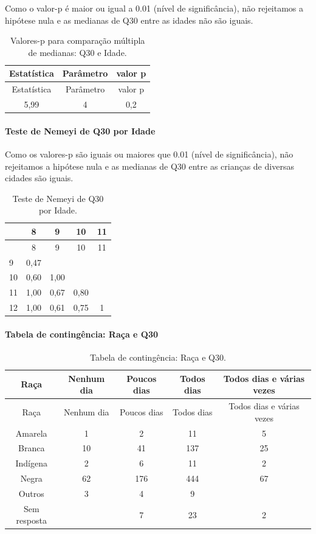 \documentclass[]{article}
\let\oldparagraph\paragraph
\renewcommand{\paragraph}[1]{\oldparagraph{#1}\mbox{}}
\begin{document}
Como o valor-p é maior ou igual a 0.01 (nível de significância), não rejeitamos a hipótese nula e as medianas de Q30 entre as idades não são iguais.

\begin{longtable}[]{@{}ccc@{}}
\caption{\label{tab:unnamed-chunk-983}Valores-p para comparação múltipla de medianas: Q30 e Idade.}\tabularnewline
\toprule
Estatística & Parâmetro & valor p\tabularnewline
\midrule
\endfirsthead
\toprule
Estatística & Parâmetro & valor p\tabularnewline
\midrule
\endhead
5,99 & 4 & 0,2\tabularnewline
\bottomrule
\end{longtable}

\hypertarget{teste-de-nemeyi-de-q30-por-idade}{%
\paragraph{Teste de Nemeyi de Q30 por Idade}\label{teste-de-nemeyi-de-q30-por-idade}}

Como os valores-p são iguais ou maiores que 0.01 (nível de significância), não rejeitamos a hipótese nula e as medianas de Q30 entre as crianças de diversas cidades são iguais.

\begin{longtable}[]{@{}lcccc@{}}
\caption{\label{tab:unnamed-chunk-985}Teste de Nemeyi de Q30 por Idade.}\tabularnewline
\toprule
& 8 & 9 & 10 & 11\tabularnewline
\midrule
\endfirsthead
\toprule
& 8 & 9 & 10 & 11\tabularnewline
\midrule
\endhead
9 & 0,47 & & &\tabularnewline
10 & 0,60 & 1,00 & &\tabularnewline
11 & 1,00 & 0,67 & 0,80 &\tabularnewline
12 & 1,00 & 0,61 & 0,75 & 1\tabularnewline
\bottomrule
\end{longtable}

\cleardoublepage

\hypertarget{tabela-de-continguxeancia-rauxe7a-e-q30}{%
\paragraph{Tabela de contingência: Raça e Q30}\label{tabela-de-continguxeancia-rauxe7a-e-q30}}

\begin{longtable}[]{@{}ccccc@{}}
\caption{\label{tab:unnamed-chunk-986}Tabela de contingência: Raça e Q30.}\tabularnewline
\toprule
Raça & Nenhum dia & Poucos dias & Todos dias & Todos dias e várias vezes\tabularnewline
\midrule
\endfirsthead
\toprule
Raça & Nenhum dia & Poucos dias & Todos dias & Todos dias e várias vezes\tabularnewline
\midrule
\endhead
Amarela & 1 & 2 & 11 & 5\tabularnewline
Branca & 10 & 41 & 137 & 25\tabularnewline
Indígena & 2 & 6 & 11 & 2\tabularnewline
Negra & 62 & 176 & 444 & 67\tabularnewline
Outros & 3 & 4 & 9 &\tabularnewline
Sem resposta & & 7 & 23 & 2\tabularnewline
\bottomrule
\end{longtable}
\end{document}
